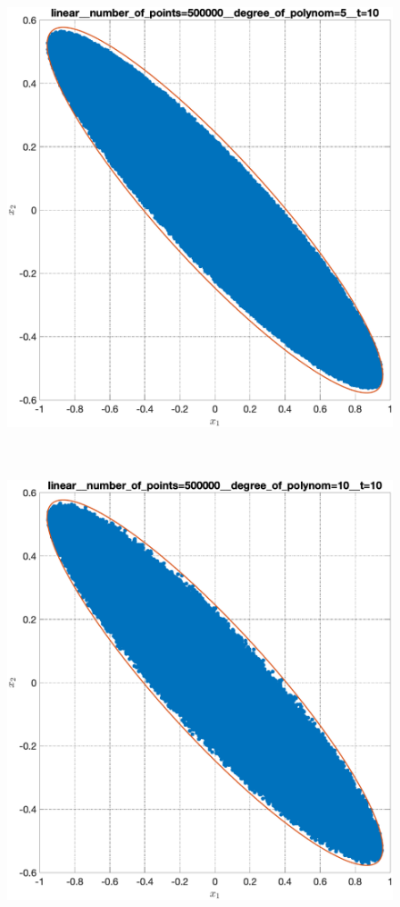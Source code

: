 \documentclass[../main.tex]{subfiles}
\begin{document}
\begin{figure}[ht!]
\begin{minipage}[b]{.3\linewidth}
  		\includegraphics[width=\linewidth]{images/linear__number_of_points=500000__degree_of_polynom=5__t=10.eps}
  	\end{minipage} 
  	\hfill
  	\begin{minipage}[b]{.3\linewidth} 
  		\small
  		\centering
  		\includegraphics[width=\linewidth]{images/linear__number_of_points=500000__degree_of_polynom=10__t=10.eps}

\end{minipage}
\end{figure}
\end{document}
